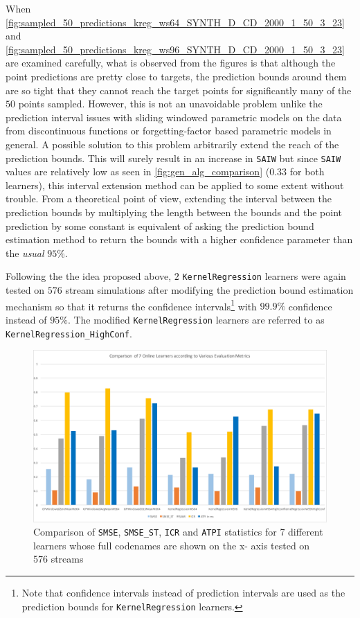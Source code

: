 When \ref{fig:sampled_50_predictions_kreg_ws64_SYNTH_D_CD_2000_1_50_3_23} and \ref{fig:sampled_50_predictions_kreg_ws96_SYNTH_D_CD_2000_1_50_3_23} are examined carefully, what is observed from the figures is that although the point predictions are pretty close to targets, the prediction bounds around them are so tight that they cannot reach the target points for significantly many of the $50$ points sampled. However, this is not an unavoidable problem unlike the prediction interval issues with sliding windowed parametric models on the data from discontinuous functions or forgetting-factor based parametric models in general. A possible solution to this problem arbitrarily extend the reach of the prediction bounds. This will surely result in an increase in \texttt{SAIW} but since \texttt{SAIW} values are relatively low as seen in \ref{fig:gen_alg_comparison} ($0.33$ for both learners), this interval extension method can be applied to some extent without trouble. From a theoretical point of view, extending the interval between the prediction bounds by multiplying the length between the bounds and the point prediction by some constant is equivalent of asking the prediction bound estimation method to return the bounds with a higher confidence parameter than the \textit{usual} $95\%$.

Following the the idea proposed above, $2$ \texttt{KernelRegression} learners were again tested on $576$ stream simulations after modifying the prediction bound estimation mechanism so that it returns the confidence intervals\footnote{Note that confidence intervals instead of prediction intervals are used as the prediction bounds for \texttt{KernelRegression} learners.} with $99.9\%$ confidence instead of $95\%$. The modified \texttt{KernelRegression} learners are referred to as \texttt{KernelRegression\_HighConf}.

\begin{figure}[htbp]
  \centering
    \includegraphics[width=\linewidth]{./Figures/final_7_comparison.pdf}
  \caption{Comparison of \texttt{SMSE}, \texttt{SMSE\_ST}, \texttt{ICR} and \texttt{ATPI} statistics for 7 different learners whose full codenames are shown on the x- axis tested on 576 streams}
  \label{fig:final_7_comparison}
\end{figure}

